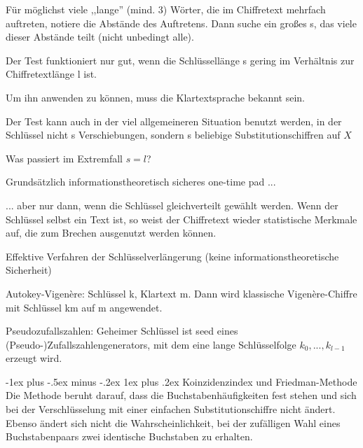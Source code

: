 \documentclass[a4paper]{article}
\makeatletter
\renewcommand{\subsubsection}{\@startsection{subsubsection}{3}{0mm}%
 {-1ex plus -.5ex minus -.2ex}%
 {1ex plus .2ex}%
 {\normalfont\small\bfseries}}
\makeatother
\begin{document}
\begin{multicols}{3}
    Für möglichst viele ,,lange'' (mind. 3) Wörter, die im Chiffretext mehrfach auftreten, notiere die Abstände des Auftretens. Dann suche ein großes s, das viele dieser Abstände teilt (nicht unbedingt alle).
    \begin{itemize*}
        \item Der Test funktioniert nur gut, wenn die Schlüssellänge s gering im Verhältnis zur Chiffretextlänge l ist.
        \item Um ihn anwenden zu können, muss die Klartextsprache bekannt sein.
        \item Der Test kann auch in der viel allgemeineren Situation benutzt werden, in der Schlüssel nicht s Verschiebungen, sondern s beliebige Substitutionschiffren auf $X$
    \end{itemize*}

    Was passiert im Extremfall $s=l$?
    \begin{itemize*}
        \item Grundsätzlich informationstheoretisch sicheres one-time pad ...
        \item ... aber nur dann, wenn die Schlüssel gleichverteilt gewählt werden. Wenn der Schlüssel selbst ein Text ist, so weist der Chiffretext wieder statistische Merkmale auf, die zum Brechen ausgenutzt werden können.
    \end{itemize*}

    Effektive Verfahren der Schlüsselverlängerung (keine informationstheoretische Sicherheit)
    \begin{itemize*}
        \item Autokey-Vigenère: Schlüssel k, Klartext m. Dann wird klassische Vigenère-Chiffre mit Schlüssel km auf m angewendet.
        \item Pseudozufallszahlen: Geheimer Schlüssel ist seed eines (Pseudo-)Zufallszahlengenerators, mit dem eine lange Schlüsselfolge $k_0,...,k_{l-1}$ erzeugt wird.
    \end{itemize*}

    \subsubsection{Koinzidenzindex und Friedman-Methode}
    Die Methode beruht darauf, dass die Buchstabenhäufigkeiten fest stehen und sich bei der Verschlüsselung mit einer einfachen Substitutionschiffre nicht ändert. Ebenso ändert sich nicht die Wahrscheinlichkeit, bei der zufälligen Wahl eines Buchstabenpaars zwei identische Buchstaben zu erhalten.


\end{multicols}
\end{document}

